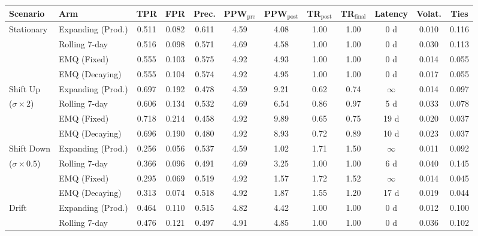 \documentclass[11pt,letterpaper]{article}
\begin{document}
\begin{table}[htbp]
\centering
\scriptsize
\setlength{\tabcolsep}{4pt}
\begin{tabular}{@{}llcccccccccc@{}}
\toprule
\textbf{Scenario} & \textbf{Arm} & \textbf{TPR} & \textbf{FPR} & \textbf{Prec.} & \textbf{PPW}$_{\text{pre}}$ & \textbf{PPW}$_{\text{post}}$ & \textbf{TR}$_{\text{post}}$ & \textbf{TR}$_{\text{final}}$ & \textbf{Latency} & \textbf{Volat.} & \textbf{Ties} \\
\midrule
Stationary & Expanding (Prod.) & 0.511 & 0.082 & 0.611 & 4.59 & 4.08 & 1.00 & 1.00 & 0 d & 0.010 & 0.116 \\
           & Rolling 7-day     & 0.516 & 0.098 & 0.571 & 4.69 & 4.58 & 1.00 & 1.00 & 0 d & 0.030 & 0.113 \\
           & EMQ (Fixed)       & 0.555 & 0.103 & 0.575 & 4.92 & 4.93 & 1.00 & 1.00 & 0 d & 0.014 & 0.055 \\
           & EMQ (Decaying)    & 0.555 & 0.104 & 0.574 & 4.92 & 4.95 & 1.00 & 1.00 & 0 d & 0.017 & 0.055 \\
\addlinespace
Shift Up   & Expanding (Prod.) & 0.697 & 0.192 & 0.478 & 4.59 & 9.21 & 0.62 & 0.74 & $\infty$ & 0.014 & 0.097 \\
($\sigma \times 2$) & Rolling 7-day     & 0.606 & 0.134 & 0.532 & 4.69 & 6.54 & 0.86 & 0.97 & 5 d & 0.033 & 0.078 \\
           & EMQ (Fixed)       & 0.718 & 0.214 & 0.458 & 4.92 & 9.89 & 0.65 & 0.75 & 19 d & 0.020 & 0.037 \\
           & EMQ (Decaying)    & 0.696 & 0.190 & 0.480 & 4.92 & 8.93 & 0.72 & 0.89 & 10 d & 0.023 & 0.037 \\
\addlinespace
Shift Down & Expanding (Prod.) & 0.256 & 0.056 & 0.537 & 4.59 & 1.02 & 1.71 & 1.50 & $\infty$ & 0.011 & 0.092 \\
($\sigma \times 0.5$) & Rolling 7-day     & 0.366 & 0.096 & 0.491 & 4.69 & 3.25 & 1.00 & 1.00 & 6 d & 0.040 & 0.145 \\
           & EMQ (Fixed)       & 0.295 & 0.069 & 0.519 & 4.92 & 1.57 & 1.72 & 1.52 & $\infty$ & 0.014 & 0.045 \\
           & EMQ (Decaying)    & 0.313 & 0.074 & 0.518 & 4.92 & 1.87 & 1.55 & 1.20 & 17 d & 0.019 & 0.044 \\
\addlinespace
Drift      & Expanding (Prod.) & 0.464 & 0.110 & 0.515 & 4.82 & 4.42 & 1.00 & 1.00 & 0 d & 0.012 & 0.100 \\
           & Rolling 7-day     & 0.476 & 0.121 & 0.497 & 4.91 & 4.85 & 1.00 & 1.00 & 0 d & 0.036 & 0.102 \\

\end{tabular}
\end{table}
\end{document}
